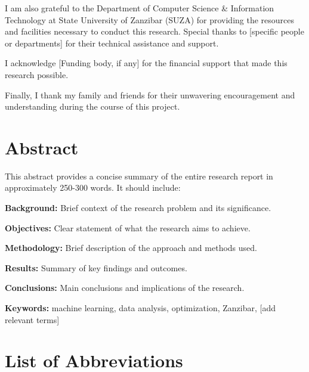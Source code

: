 \documentclass[12pt, a4paper]{report}
\newcommand{\suza}{State University of Zanzibar (SUZA)}
\newcommand{\dept}{Department of Computer Science \& Information Technology}
\begin{document}
	I am also grateful to the \dept{} at \suza{} for providing the resources and facilities necessary to conduct this research. Special thanks to [specific people or departments] for their technical assistance and support.
	
	I acknowledge [Funding body, if any] for the financial support that made this research possible.
	
	Finally, I thank my family and friends for their unwavering encouragement and understanding during the course of this project.
	
	\chapter*{Abstract}
	
	This abstract provides a concise summary of the entire research report in approximately 250-300 words. It should include:
	
	\textbf{Background:} Brief context of the research problem and its significance.
	
	\textbf{Objectives:} Clear statement of what the research aims to achieve.
	
	\textbf{Methodology:} Brief description of the approach and methods used.
	
	\textbf{Results:} Summary of key findings and outcomes.
	
	\textbf{Conclusions:} Main conclusions and implications of the research.
	
	\textbf{Keywords:} machine learning, data analysis, optimization, Zanzibar, [add relevant terms]
	
	\tableofcontents
	\listoffigures
	\listoftables
	
	\chapter*{List of Abbreviations}
	
\end{document}
